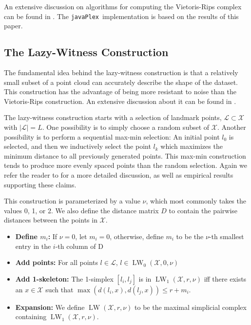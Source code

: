 \documentclass{gts2012}
\newcommand\javaPlex{\texttt{javaPlex}\ }
\newcommand{\LW}{\operatorname{LW}}
\begin{document}
An extensive discussion on algorithms for computing the Vietoris-Rips complex can be found in \cite{Zomorodian}. The \javaPlex implementation is based on the results of this paper.

\subsection{The Lazy-Witness Construction}
The fundamental idea behind the lazy-witness construction is that a relatively small subset of a point cloud can accurately describe the shape of the dataset. This construction has the advantage of being more resistant to noise than the Vietoris-Rips construction. An extensive discussion about it can be found in \cite{Witness}. 

The lazy-witness construction starts with a selection of landmark points, $\mathcal{L} \subset \mathcal{X}$ with $|\mathcal{L}| = L$. One possibility is to simply choose a random subset of $\mathcal{X}$. Another possibility is to perform a sequential max-min selection: An initial point $l_0$ is selected, and then we inductively select the point $l_k$ which maximizes the minimum distance to all previously generated points. This max-min construction tends to produce more evenly spaced points than the random selection. Again we refer the reader to \cite{Witness} for a more detailed discussion, as well as empirical results supporting these claims.

This construction is parameterized by a value $\nu$, which most commonly takes the values 0, 1, or 2. We also define the distance matrix $D$ to contain the pairwise distances between the points in $\mathcal{X}$. 

\begin{itemize}
\item {\bf Define $m_i$:} If $\nu = 0$, let $m_i = 0$, otherwise, define $m_i$ to be the $\nu$-th smallest entry in the $i$-th column of D
\item {\bf Add points:} For all points $l \in \mathcal{L}$, $l \in \LW_0(\mathcal{X}, 0, \nu)$
\item {\bf Add 1-skeleton:} The 1-simplex $[l_i, l_j]$ is in $\LW_1(\mathcal{X}, r, \nu)$ iff there exists an $x \in \mathcal{X}$ such that $\max(d(l_i, x), d(l_j, x)) \leq r + m_i$.
\item {\bf Expansion:} We define $\LW(\mathcal{X}, r, \nu)$ to be the maximal simplicial complex containing $\LW_1(\mathcal{X}, r, \nu)$. 
\end{itemize}
\end{document}
